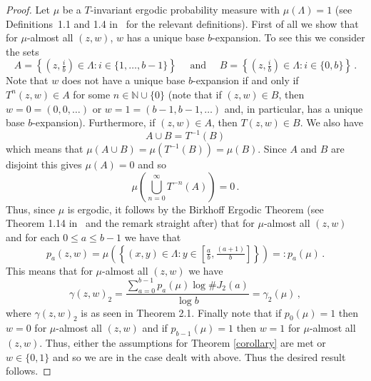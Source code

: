 \documentclass[12pt]{article}
\theoremstyle{remark}
\numberwithin{equation}{section}
\renewcommand{\Bbb}[1]{\mathbb{#1}}
\newcommand{\N}{{\Bbb N}}         %
\newcommand{\0}{\mathbf{0}}
\begin{document}
\begin{proof}
Let $\mu$ be a $T$-invariant ergodic probability measure with $\mu(\Lambda)=1$ (see Definitions~1.1 and 1.4 in~\cite{Waltersbook} for the relevant definitions). First of all we show that for $\mu$-almost all $(z,w)$, $w$ has a unique base $b$-expansion. To see this we consider the sets
\begin{equation*}
    A=\left\{\left(z,\tfrac{i}{b}\right)\in\Lambda:i\in\{1,\ldots,b-1\}\right\}\quad \text{ and } \quad B=\left\{\left(z,\tfrac{i}{b}\right)\in\Lambda:i\in\{0,b\}\right\}\, .
\end{equation*}
Note that $w$ does not have a unique base $b$-expansion if and only if $T^n(z,w)\in A$ for some $n\in \N \cup \{0\}$ (note that if $(z,w) \in B$, then $w=0=(0,0,\dots)$ or $w=1=(b-1,b-1,\dots)$ and, in particular, has a unique base $b$-expansion). Furthermore, if $(z,w)\in A$, then $T(z,w)\in B$. We also have 
$$A\cup B = T^{-1}(B)$$
which means that $\mu(A\cup B)=\mu(T^{-1}(B))=\mu(B)$. Since $A$ and $B$ are disjoint this gives $\mu(A)=0$ and so 
\begin{equation*}
\mu\left(\bigcup_{n=0}^{\infty}T^{-n}(A)\right)=0\, .    
\end{equation*}
Thus, since $\mu$ is ergodic, it follows by the Birkhoff Ergodic Theorem (see Theorem 1.14 in~\cite{Waltersbook} and the remark straight after) that for $\mu$-almost all $(z,w)$
and for each $0\leq a\leq b-1$ we have that 
\begin{equation}\label{frequency}
p_a(z,w)=\mu\left(\left\{(x,y)\in\Lambda:y\in \left[\tfrac{a}{b},\tfrac{(a+1)}{b}\right]\right\}\right)=:p_a(\mu)\, .
\end{equation}
This means that for $\mu$-almost all $(z,w)$ we have
\begin{equation*}
    \gamma(z,w)_2=\frac{\sum_{a=0}^{b-1} p_a(\mu)\log \#J_2(a)}{\log b}=\gamma_2(\mu)\, ,
\end{equation*}
where $\gamma(z,w)_2$ is as seen in Theorem 2.1.
Finally note that if $p_0(\mu)=1$ then $w=0$ for \mbox{$\mu$-almost} all $(z,w)$ and if $p_{b-1}(\mu)=1$ then $w=1$ for $\mu$-almost all $(z,w)$. Thus, either the assumptions for Theorem \ref{corollary} are met or $w \in \{0,1\}$ and so we are in the case dealt with above. Thus the desired result follows.
\end{proof}
\end{document}
